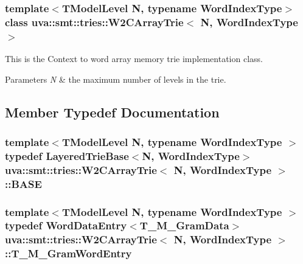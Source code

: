 \subsubsection*{template$<$T\+Model\+Level N, typename Word\+Index\+Type$>$class uva\+::smt\+::tries\+::\+W2\+C\+Array\+Trie$<$ N, Word\+Index\+Type $>$}

This is the Context to word array memory trie implementation class.


\begin{DoxyParams}{Parameters}
{\em N} & the maximum number of levels in the trie. \\
\hline
\end{DoxyParams}


\subsection{Member Typedef Documentation}
\hypertarget{classuva_1_1smt_1_1tries_1_1_w2_c_array_trie_a9089f2521a6f1972349b497a65afe2a0}{}
\subsubsection[{B\+A\+S\+E}]{\setlength{\rightskip}{0pt plus 5cm}template$<$T\+Model\+Level N, typename Word\+Index\+Type $>$ typedef {\bf Layered\+Trie\+Base}$<$N, {\bf Word\+Index\+Type}$>$ {\bf uva\+::smt\+::tries\+::\+W2\+C\+Array\+Trie}$<$ N, {\bf Word\+Index\+Type} $>$\+::{\bf B\+A\+S\+E}}\label{classuva_1_1smt_1_1tries_1_1_w2_c_array_trie_a9089f2521a6f1972349b497a65afe2a0}
\hypertarget{classuva_1_1smt_1_1tries_1_1_w2_c_array_trie_a6dd317e401c26bda2ee608e065b10497}{}
\subsubsection[{T\+\_\+\+M\+\_\+\+Gram\+Word\+Entry}]{\setlength{\rightskip}{0pt plus 5cm}template$<$T\+Model\+Level N, typename Word\+Index\+Type $>$ typedef {\bf Word\+Data\+Entry}$<${\bf T\+\_\+\+M\+\_\+\+Gram\+Data}$>$ {\bf uva\+::smt\+::tries\+::\+W2\+C\+Array\+Trie}$<$ N, {\bf Word\+Index\+Type} $>$\+::{\bf T\+\_\+\+M\+\_\+\+Gram\+Word\+Entry}\hspace{0.3cm}{\ttfamily [protected]}}\label{classuva_1_1smt_1_1tries_1_1_w2_c_array_trie_a6dd317e401c26bda2ee608e065b10497}
\hypertarget{classuva_1_1smt_1_1tries_1_1_w2_c_array_trie_a7274c5d10d8c998fe137ce0fd58cddf7}{}
